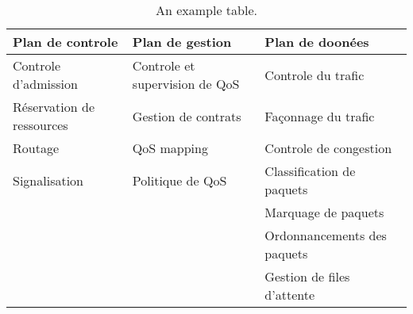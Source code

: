 \begin{table}[h!]
\scriptsize
	\begin{tabulary}{\textwidth}{L|L|L}
		\textbf{Plan de controle}   & \textbf{Plan de gestion}   & 	\textbf{Plan de doonées}  \\\hline
	Controle d'admission      & Controle et supervision de QoS & Controle du trafic         \\
	Réservation de ressources & Gestion de contrats            & Façonnage du trafic        \\
	Routage                   & QoS mapping                    & Controle de congestion     \\
	Signalisation             & Politique de QoS               & Classification de paquets  \\
	\                         &                                & Marquage de paquets        \\
	\                         &                                & Ordonnancements des paquets\\
	\                         &                                & Gestion de files d'attente \\
	\end{tabulary}
	\caption{\label{tab:qos} An example table.}
\end{table}

%	


